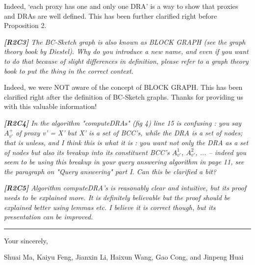 \documentclass[11pt]{letter}
\newcommand{\vs}{\vspace{1ex}}
\newcommand{\svs}{\vspace{0.36ex}}
\begin{document}
Indeed, `each proxy has one and only one DRA' is a way to show that proxies and DRAs are well defined. This has been further clarified right before Proposition 2.

\vs
\noindent
{\em
{\bf [R2C3]} The BC-Sketch graph is also known as BLOCK GRAPH (see the graph theory book by Diestel). Why do you introduce a new name, and even if you want to do that because of slight differences in definition, please refer to a graph theory book to put the thing in the correct context.}
\svs

Indeed, we were NOT aware of the concept of BLOCK GRAPH. This has been clarified right after the definition of BC-Sketch graphs. Thanks for providing us with this valuable information!


\vs
\noindent
{\em{\bf[R2C4]}  In the algorithm "computeDRAs" (fig 4) line 15 is confusing : you say $A^+_{v'}$ of proxy v' = X' but X' is a set of BCC's, while the DRA is a set of nodes; that is unless, and I think this is what it is : you want not only the DRA as a set of nodes but also its breakup into its constituent BCC's $A^1_{v'}$, $A^2_{v'}$, ... -- indeed you seem to be using this breakup in your query answering algorithm in page 11, see the paragraph on "Query answering" part I. Can this be clarified a bit?}
\svs


\vs
\noindent
{\em{\bf[R2C5]} Algorithm computeDRA's is reasonably clear and intuitive, but its proof needs to be explained more. It is definitely believable but the proof should be explained better using lemmas etc. I believe it is correct though, but its presentation can be improved.}
\svs



\vspace{3.6ex}
\hrule
\vspace{3.6ex}
\closing{Your sincerely,}

\vspace{-8ex}
Shuai Ma, Kaiyu Feng, Jianxin Li, Haixun Wang, Gao Cong, and Jinpeng Huai
\end{document}
